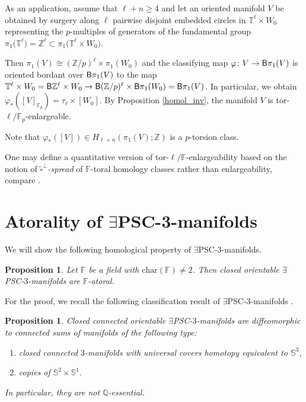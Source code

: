 \documentclass[10pt,a4paper]{amsart}
\numberwithin{equation}{section}
\newtheorem{Proposition}[Theorem]{Proposition}
\newcommand{\F}{\mathbb{F}}
\newcommand{\Z}{\mathbb{Z}}
\newcommand{\SSS}{\mathbb{S}}
\newcommand{\TTT}{\mathbb{T}}
\newcommand{\charac}{\mathrm{char}}
\newcommand{\sB}{{\sf B}}
\newcommand{\myicon}{$\,\,\,\triangleright$}
\newcommand{\yes}{{\color {blue!70!black}$\exists$}{\sf PSC}}
\begin{document}
\begin{Example}
As an application, assume that $\ell + n \geq 4$ and let an oriented manifold $V$ be obtained by surgery along $\ell$ pairwise disjoint embedded circles in $\TTT^{\ell} \times W_0$ representing the $p$-multiples of generators of the fundamental group $\pi_1\big({\TTT}^\ell\big) = \Z^\ell \subset \pi_1\big(\TTT^{\ell} \times W_0\big)$.


Then $\pi_1(V) \cong (\Z/p)^\ell \times \pi_1(W_0)$ and the classifying map $\varphi \colon V \to \sB \pi_1(V)$ is oriented bordant over $\sB \pi_1(V)$ to the map $\TTT^{\ell} \times W_0 = \sB \Z^{\ell} \times W_0 \to \sB (\Z/p)^{\ell} \times \sB \pi_1(W_0) = \sB \pi_1(V)$.
In particular, we obtain $\varphi_{*}([V]_{\F_p}) = \tau_\ell \times [W_0]$.
By Proposition \ref{homol_inv}, the manifold $V$ is tor-$\ell/\F_p$-enlargeable.

Note that $\varphi_*([V]) \in H_{\ell+n}(\pi_1(V); \Z)$ is a $p$-torsion class.
\end{Example}

\begin{Remark} One may define a quantitative version of tor-$\ell/\F$-enlargeability based on the notion of {\em $\tilde \square^{\perp}$-spread} of $\F$-toral homology classes rather than enlargeability, compare \cite[Section~7.1]{Gr21}.
\end{Remark}


\section[Atorality of PSC-3-manifolds]{Atorality of \yes-$\boldsymbol{3}$-manifolds} \label{nopsc}

We will show the following homological property of \yes-$3$-manifolds.

 \begin{Proposition} \label{prop:toralthree}
Let $\F$ be a field with $\charac( \F) \neq 2$.
Then closed orientable \yes-$3$-manifolds are $\F$-atoral.
\end{Proposition}

For the proof, we recall the following classification result of \yes-$3$-manifolds \cite{G-L1983}.

\begin{Proposition} \label{prop:decompthree} Closed connected orientable \yes-$3$-manifolds are diffeomorphic to connected sums of manifolds of the following type:
\begin{enumerate}[\myicon]\itemsep=0pt
\item closed connected $3$-manifolds with universal covers homotopy equivalent to $\SSS^3$,
\item copies of $\SSS^2\times \SSS^1$.
\end{enumerate}
In particular, they are not $\mathbb{Q}$-essential.
\end{Proposition}
\end{document}
